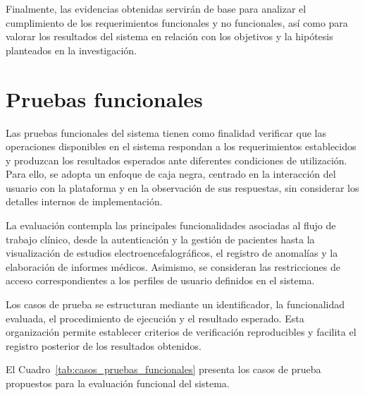 Finalmente, las evidencias obtenidas servirán de base para analizar el cumplimiento de los requerimientos funcionales y no funcionales, así como para valorar los resultados del sistema en relación con los objetivos y la hipótesis planteados en la investigación.


\section{Pruebas funcionales}
\label{sec:pruebas_funcionales}

Las pruebas funcionales del sistema tienen como finalidad verificar que las operaciones disponibles en el sistema respondan a los requerimientos establecidos y produzcan los resultados esperados ante diferentes condiciones de utilización. Para ello, se adopta un enfoque de caja negra, centrado en la interacción del usuario con la plataforma y en la observación de sus respuestas, sin considerar los detalles internos de implementación.

La evaluación contempla las principales funcionalidades asociadas al flujo de trabajo clínico, desde la autenticación y la gestión de pacientes hasta la visualización de estudios electroencefalográficos, el registro de anomalías y la elaboración de informes médicos. Asimismo, se consideran las restricciones de acceso correspondientes a los perfiles de usuario definidos en el sistema.

Los casos de prueba se estructuran mediante un identificador, la funcionalidad evaluada, el procedimiento de ejecución y el resultado esperado. Esta organización permite establecer criterios de verificación reproducibles y facilita el registro posterior de los resultados obtenidos.

El Cuadro~\ref{tab:casos_pruebas_funcionales} presenta los casos de prueba propuestos para la evaluación funcional del sistema.


\begingroup
\small
\setlength{\tabcolsep}{4pt}
\renewcommand{\arraystretch}{1.2}


